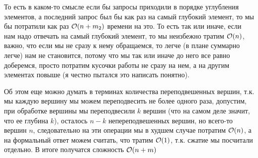 \begin{solution}
    \begin{remark}
        То есть в каком-то смысле если бы запросы приходили в порядке углубления элементов, а последний запрос был бы как раз на самый глубокий элемент, то мы бы потратили как раз $\mathcal{O}(n + m_2)$ времени на это. То есть так или иначе, если нам надо отвечать на самый глубокий элемент, то мы неизбежно тратим $\mathcal{O}(n)$, важно, что если мы не сразу к нему обращаемся, то легче (в плане суммарно легче) нам не становится, потому что мы так или иначе до него все равно доберемся, просто потратим кусочки работы не сразу на нем, а на другим элементах повыше (я честно пытался это написать понятно).
    \end{remark}

    Об этом еще можно думать в терминах количества переподвешенных вершин, т.к. мы каждую вершину мы можем переподвесить не более одного раза, допустим, при обработке вершины мы переподвесили $k$ вершин (что на самом деле значит, что ее глубина $k$), осталось $n-k$ непереподвешенных вершин, но всего-то вершин $n$, следовательно на эти операции мы в худшем случае потратим $\mathcal{O}(n)$, а на формальный ответ можем считать, что тратим $\mathcal{O}(1)$, т.к. сжатие мы посчитали отдельно. В итоге получатся сложность $\mathcal{O}(n + m)$
\end{solution}